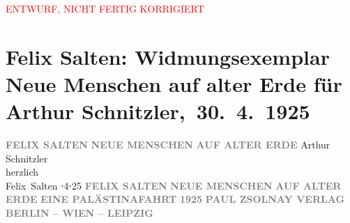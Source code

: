 
\begin{center}
            \textcolor{red}{ENTWURF, NICHT FERTIG KORRIGIERT}
                      \end{center}
            
         
         \renewcommand{\erwaehntePersonen}{Personen: Felix Salten}
         \renewcommand{\erwaehnteInstitutionen}{Institutionen: Paul Zsolnay Verlag}
         \renewcommand{\erwaehnteOrte}{Orte: Berlin, Leipzig, Wien}
         \renewcommand{\erwaehnteWerke}{}
               \section[ Felix Salten: Widmungsexemplar Neue Menschen auf alter Erde für Arthur Schnitzler, 30. 4. 1925]{ Felix Salten: Widmungsexemplar Neue Menschen auf alter Erde für Arthur
               Schnitzler, 30. 4. 1925}\nopagebreak{}\rehead{ }\begin{ledgroupsized}[t]{13cm}\normalsize\beginnumbering \toendnotes[C]{\smallbreak\pagebreak[2]} 
\pstart
           \noindent{}\centering{}{\pb}\textcolor{gray}{\textbf{FELIX SALTEN}}\pend
           \pstart
           \noindent{}\centering{}\textcolor{gray}{\textbf{NEUE MENSCHEN}}\pend
           \pstart
           \noindent{}\centering{}\textcolor{gray}{\textbf{AUF ALTER ERDE}}\pend
           {\bigskip}\pstart
           \noindent{}Arthur Schnitzler {\\}herzlich{\\}\spacefill\mbox{Felix Salten}\pend
           ⋅4⋅25\pend
           {\bigskip}\pstart
           \noindent{}\centering{}{\pb}\textcolor{gray}{\textbf{FELIX SALTEN}}\pend
           \pstart
           \noindent{}\centering{}\textcolor{gray}{\textbf{NEUE MENSCHEN}}\pend
           \pstart
           \noindent{}\centering{}\textcolor{gray}{\textbf{AUF ALTER ERDE}}\pend
           {\bigskip}\pstart
           \noindent{}\centering{}\textcolor{gray}{\textbf{EINE PALÄSTINAFAHRT}}\pend
           {\bigskip}\pstart
           \noindent{}\centering{}\textcolor{gray}{\textbf{1925}}\pend
           \pstart
           \noindent{}\centering{}\textcolor{gray}{\textbf{PAUL ZSOLNAY VERLAG}}\pend
           \pstart
           \noindent{}\centering{}\textcolor{gray}{\textbf{BERLIN – WIEN – LEIPZIG}}\pend
           
         
         \endnumbering{}\end{ledgroupsized}  \newcommand{\dateiname}{L03045}\newcommand{\titel}{Felix Salten: Widmungsexemplar Neue Menschen auf alter Erde für Arthur Schnitzler, 30. 4. 1925}\newcommand{\editorInnen}{Martin Anton Müller und Laura Untner}
      
